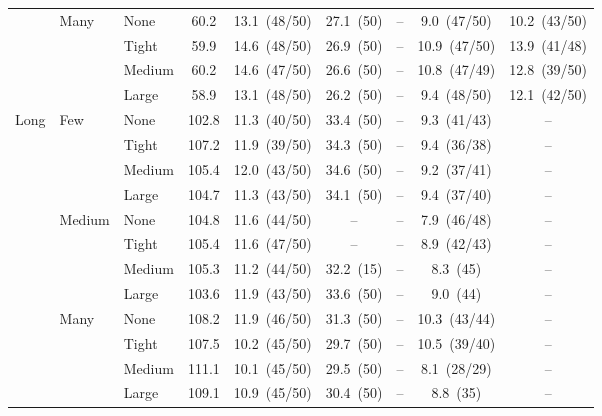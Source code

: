 \begin{table}[htbp]
\begin{tabular}{lll c ccccc}
 & \multirow{4}{*}{\small Many} & {\small None} & 60.2 & 13.1~{\scriptsize(48/50)} & 27.1~{\scriptsize(50)} & -- & 9.0~{\scriptsize(47/50)} & 10.2~{\scriptsize(43/50)} \\
 &  & {\small Tight} & 59.9 & 14.6~{\scriptsize(48/50)} & 26.9~{\scriptsize(50)} & -- & 10.9~{\scriptsize(47/50)} & 13.9~{\scriptsize(41/48)} \\
 &  & {\small Medium} & 60.2 & 14.6~{\scriptsize(47/50)} & 26.6~{\scriptsize(50)} & -- & 10.8~{\scriptsize(47/49)} & 12.8~{\scriptsize(39/50)} \\
 &  & {\small Large} & 58.9 & 13.1~{\scriptsize(48/50)} & 26.2~{\scriptsize(50)} & -- & 9.4~{\scriptsize(48/50)} & 12.1~{\scriptsize(42/50)} \\
\midrule
\multirow{12}{*}{\small Long} & \multirow{4}{*}{\small Few} & {\small None} & 102.8 & 11.3~{\scriptsize(40/50)} & 33.4~{\scriptsize(50)} & -- & 9.3~{\scriptsize(41/43)} & -- \\
 &  & {\small Tight} & 107.2 & 11.9~{\scriptsize(39/50)} & 34.3~{\scriptsize(50)} & -- & 9.4~{\scriptsize(36/38)} & -- \\
 &  & {\small Medium} & 105.4 & 12.0~{\scriptsize(43/50)} & 34.6~{\scriptsize(50)} & -- & 9.2~{\scriptsize(37/41)} & -- \\
 &  & {\small Large} & 104.7 & 11.3~{\scriptsize(43/50)} & 34.1~{\scriptsize(50)} & -- & 9.4~{\scriptsize(37/40)} & -- \\
 & \multirow{4}{*}{\small Medium} & {\small None} & 104.8 & 11.6~{\scriptsize(44/50)} & -- & -- & 7.9~{\scriptsize(46/48)} & -- \\
 &  & {\small Tight} & 105.4 & 11.6~{\scriptsize(47/50)} & -- & -- & 8.9~{\scriptsize(42/43)} & -- \\
 &  & {\small Medium} & 105.3 & 11.2~{\scriptsize(44/50)} & 32.2~{\scriptsize(15)} & -- & 8.3~{\scriptsize(45)} & -- \\
 &  & {\small Large} & 103.6 & 11.9~{\scriptsize(43/50)} & 33.6~{\scriptsize(50)} & -- & 9.0~{\scriptsize(44)} & -- \\
 & \multirow{4}{*}{\small Many} & {\small None} & 108.2 & 11.9~{\scriptsize(46/50)} & 31.3~{\scriptsize(50)} & -- & 10.3~{\scriptsize(43/44)} & -- \\
 &  & {\small Tight} & 107.5 & 10.2~{\scriptsize(45/50)} & 29.7~{\scriptsize(50)} & -- & 10.5~{\scriptsize(39/40)} & -- \\
 &  & {\small Medium} & 111.1 & 10.1~{\scriptsize(45/50)} & 29.5~{\scriptsize(50)} & -- & 8.1~{\scriptsize(28/29)} & -- \\
 &  & {\small Large} & 109.1 & 10.9~{\scriptsize(45/50)} & 30.4~{\scriptsize(50)} & -- & 8.8~{\scriptsize(35)} & -- \\
\bottomrule
\end{tabular}
\end{table}
